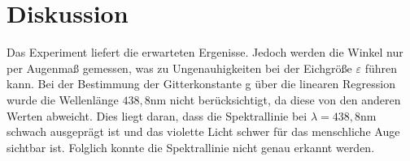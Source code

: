 \section{Diskussion}
\label{sec:Diskussion}
Das Experiment liefert die erwarteten Ergenisse.
Jedoch werden die Winkel nur per Augenmaß gemessen,
was zu Ungenauhigkeiten bei der Eichgröße $\varepsilon$ führen kann. Bei der
Bestimmung der Gitterkonstante g über die linearen Regression wurde die
Wellenlänge $438,8\si{\nano\meter}$ nicht berücksichtigt, da
diese von den anderen Werten abweicht. Dies liegt daran, dass
die Spektrallinie bei $\lambda=438,8\si{\nano\meter}$
schwach ausgeprägt ist
und das violette Licht schwer für das menschliche Auge sichtbar ist.
Folglich konnte die Spektrallinie nicht genau erkannt werden. 

